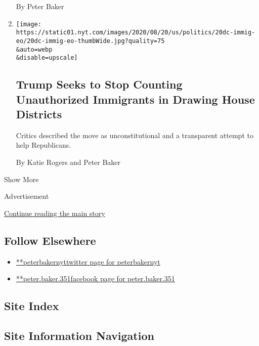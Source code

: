 \begin{enumerate}
  By Peter Baker
\item
  \href{/2020/07/21/us/politics/trump-immigrants-census-redistricting.html}{}

  \texttt{[image: https://static01.nyt.com/images/2020/08/20/us/politics/20dc-immig-eo/20dc-immig-eo-thumbWide.jpg?quality=75\\\&auto=webp\\\&disable=upscale]}

  \hypertarget{trump-seeks-to-stop-counting-unauthorized-immigrants-in-drawing-house-districts}{%
  \subsection{Trump Seeks to Stop Counting Unauthorized Immigrants in
  Drawing House
  Districts}\label{trump-seeks-to-stop-counting-unauthorized-immigrants-in-drawing-house-districts}}

  Critics described the move as unconstitutional and a transparent
  attempt to help Republicans.

  By Katie Rogers and Peter Baker
\end{enumerate}

Show More

Advertisement

\protect\hyperlink{after-mid2}{Continue reading the main story}

\hypertarget{follow-elsewhere}{%
\subsection{Follow Elsewhere}\label{follow-elsewhere}}

\begin{itemize}
\tightlist
\item
  \href{https://twitter.com/peterbakernyt}{**peterbakernyttwitter page
  for peterbakernyt}
\item
  \href{https://www.facebook.com/peter.baker.351}{**peter.baker.351facebook
  page for peter.baker.351}
\end{itemize}

\hypertarget{site-index}{%
\subsection{Site Index}\label{site-index}}

\hypertarget{site-information-navigation}{%
\subsection{Site Information
Navigation}\label{site-information-navigation}}

